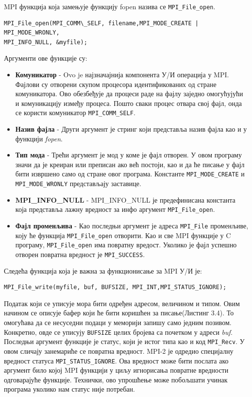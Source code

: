 MPI функција која замењује функцију fopen назива се \texttt{MPI\_File\_open}.

\begin{verbatim}
MPI_File_open(MPI_COMM\_SELF, filename,MPI_MODE_CREATE | MPI_MODE_WRONLY,
MPI_INFO_NULL, &myfile);
\end{verbatim}

Аргументи ове функције су:

\begin{itemize}
\item \textbf{Комуникатор} - Ovo je најзначајнија компонента У/И операција у MPI. Фајлови су отворени скупом процесора идентификованих од стране комуникатора. 
Ово обезбеђује да процеси раде на фајлу заједно омогућујући и комуникацију између процеса. 
Пошто сваки процес отвара свој фајл, онда се користи комуникатор \texttt{MPI\_COMM\_SELF}.

\item \textbf{Назив фајла} - Други аргумент је стринг који представља назив фајла као и у функцији \textit{fopen}.

\item \textbf{Тип мода} - Трећи аргумент је мод у коме је фајл отворен. У овом програму значи да је креиран или преписан ако већ постоји, као и да ће писање у фајл бити извршено само од стране овог програма. Константе  \texttt{MPI\_MODE\_CREATE} и \texttt{MPI\_MODE\_WRONLY} представљају заставице.

\item  \textbf{MPI\_INFO\_NULL} - MPI\_INFO\_NULL је предефинисана константа која представља лажну вредност за инфо аргумент \texttt{MPI\_File\_open}. 

\item \textbf{Фајл променљива} - Као последњи аргумент је адреса \texttt{MPI\_File} променљиве, коју ће функција  \texttt{MPI\_File\_open} отворити. Као и све MPI функције у C програму, \texttt{MPI\_File\_open} има повратну вредост. Уколико је фајл успешно отворен повратна вредност је \texttt{MPI\_SUCCESS}.

\end{itemize}
 
Следећа функција која је важна за функционисање за MPI У/И је:

 \begin{verbatim}
MPI_File_write(myfile, buf, BUFSIZE, MPI_INT,MPI_STATUS_IGNORE);
\end{verbatim}

Податак који се уписује мора бити одређен адресом, величином и типом. Овим начином се описује бафер који ће бити коришћен за писање(Листинг 3.4). То омогућава да се несуседни подаци у меморији запишу само једним позивом. Конкретно, овде се уписују 
\texttt{BUFSIZE} целих бројева са почетком у адреси \textit{buf}. Последњи аргумент функције је статус, који је истог типа као и код \texttt{MPI\_Recv}.
У овом сличају занемариће се повратна вредност. MPI-2 је одредио специјалну вредност статуса \texttt{MPI\_STATUS\_IGNORE}. Ова вредност може бити послата ако аргумент било којој MPI функцији у циљу игнорисања повратне вредности одговарајуће функције.
Технички, ово упрошћење може побољшати учинак програма уколико нам статус није потребан.

